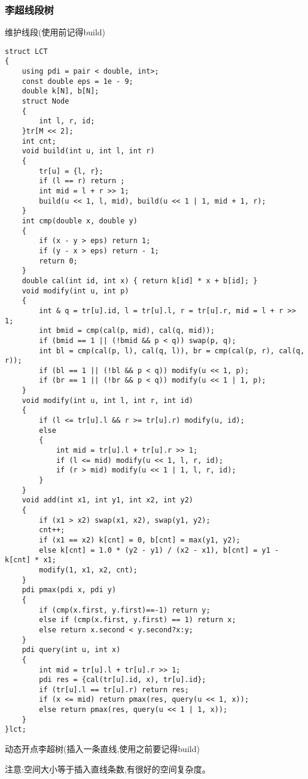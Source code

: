 \documentclass[a4paper,fontset=none]{ctexart}
\begin{document}
\subsubsection{李超线段树}
维护线段(使用前记得build)
\begin{verbatim}
struct LCT
{
    using pdi = pair < double, int>;
    const double eps = 1e - 9;
    double k[N], b[N];
    struct Node
    {
        int l, r, id;
    }tr[M << 2];
    int cnt;
    void build(int u, int l, int r)
    {
        tr[u] = {l, r};
        if (l == r) return ;
        int mid = l + r >> 1;
        build(u << 1, l, mid), build(u << 1 | 1, mid + 1, r);
    }
    int cmp(double x, double y)
    {
        if (x - y > eps) return 1;
        if (y - x > eps) return - 1;
        return 0;
    }
    double cal(int id, int x) { return k[id] * x + b[id]; }
    void modify(int u, int p)
    {
        int & q = tr[u].id, l = tr[u].l, r = tr[u].r, mid = l + r >> 1;
        int bmid = cmp(cal(p, mid), cal(q, mid));
        if (bmid == 1 || (!bmid && p < q)) swap(p, q);
        int bl = cmp(cal(p, l), cal(q, l)), br = cmp(cal(p, r), cal(q, r));
        if (bl == 1 || (!bl && p < q)) modify(u << 1, p);
        if (br == 1 || (!br && p < q)) modify(u << 1 | 1, p);
    }
    void modify(int u, int l, int r, int id)
    {
        if (l <= tr[u].l && r >= tr[u].r) modify(u, id);
        else
        {
            int mid = tr[u].l + tr[u].r >> 1;
            if (l <= mid) modify(u << 1, l, r, id);
            if (r > mid) modify(u << 1 | 1, l, r, id);
        }
    }
    void add(int x1, int y1, int x2, int y2)
    {
        if (x1 > x2) swap(x1, x2), swap(y1, y2);
        cnt++;
        if (x1 == x2) k[cnt] = 0, b[cnt] = max(y1, y2);
        else k[cnt] = 1.0 * (y2 - y1) / (x2 - x1), b[cnt] = y1 - k[cnt] * x1;
        modify(1, x1, x2, cnt);
    }
    pdi pmax(pdi x, pdi y)
    {
        if (cmp(x.first, y.first)==-1) return y;
        else if (cmp(x.first, y.first) == 1) return x;
        else return x.second < y.second?x:y;
    }
    pdi query(int u, int x)
    {
        int mid = tr[u].l + tr[u].r >> 1;
        pdi res = {cal(tr[u].id, x), tr[u].id};
        if (tr[u].l == tr[u].r) return res;
        if (x <= mid) return pmax(res, query(u << 1, x));
        else return pmax(res, query(u << 1 | 1, x));
    }
}lct;
\end{verbatim}

动态开点李超树(插入一条直线,使用之前要记得build)

注意:空间大小等于插入直线条数,有很好的空间复杂度。
\end{document}
